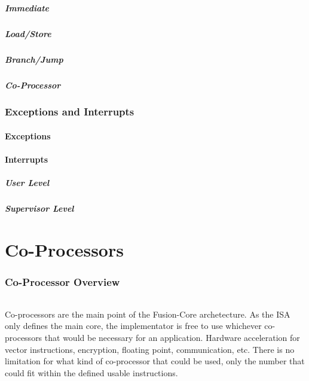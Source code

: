 \documentclass[letterpaper, 11pt]{article}
\begin{document}
\subsubsection{Immediate}
\subsubsection{Load/Store}
\subsubsection{Branch/Jump}
\subsubsection{Co-Processor}



\section{Exceptions and Interrupts}
\subsection{Exceptions}


\subsection{Interrupts}
\subsubsection{User Level}
\subsubsection{Supervisor Level}

\clearpage
\part{Co-Processors}
\section{Co-Processor Overview}
\paragraph{}Co-processors are the main point of the Fusion-Core archetecture. As the ISA only defines the main core, the implementator is free to use
whichever co-processors that would be necessary for an application. Hardware acceleration for vector instructions, encryption, floating point, communication,
etc. There is no limitation for what kind of co-processor that could be used, only the number that could fit within the defined usable instructions.
\end{document}
